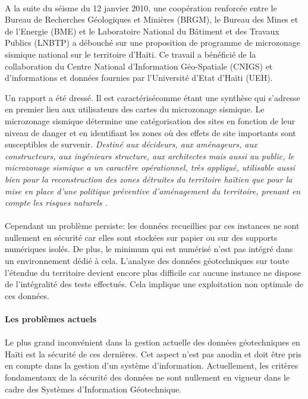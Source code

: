 \paragraph{}
A la suite du séisme du 12 janvier 2010, une coopération renforcée entre le Bureau de
Recherches Géologiques et Minières (BRGM), le Bureau des Mines et de l’Energie (BME) et le
Laboratoire National du Bâtiment et des Travaux Publics (LNBTP) a débouché sur une
proposition de programme de microzonage sismique national sur le territoire d’Haïti.
Ce travail a bénéficié de la collaboration du
Centre National d’Information Géo-Spatiale (CNIGS) et d’informations et données fournies par
l’Université d’Etat d’Haïti (UEH).
\par 
Un rapport \cite{bertil63100equipe} a été dressé. Il est caractérisécomme étant une synthèse qui s’adresse en premier 
lieu aux utilisateurs des cartes du microzonage sismique.
Le microzonage sismique détermine une catégorisation des sites
en fonction de leur niveau de danger et en identifiant les zones où des effets de site
importants sont susceptibles de survenir.
\textit{
         Destiné aux décideurs, aux aménageurs, aux
constructeurs, aux ingénieurs structure, aux architectes mais aussi au public, le microzonage
sismique a un caractère opérationnel, très appliqué, utilisable aussi bien pour la
reconstruction des zones détruites du territoire haïtien que pour la mise en place d’une
politique préventive d’aménagement du territoire, prenant en compte les risques naturels
\cite{bertil63100equipe}.
}

\paragraph{}
Cependant un problème persiste: les données recueillies par ces instances
ne sont nullement en sécurité car elles sont stockées sur papier ou sur des supports numériques isolés.
De plus, le minimum qui est numérisé n'est pas intégré dans un environnement 
dédié à cela.
L'analyse des données géotechniques sur toute l'étendue du territoire devient
encore plus difficile car aucune instance ne dispose de l'intégralité des tests effectués.
Cela implique une exploitation non optimale de ces données.
\paragraph{Les problèmes actuels}
\paragraph{}
Le plus grand inconvénient dans la gestion actuelle des données géotechniques
en Haïti est la sécurité de ces dernières. 
Cet aspect n'est pas anodin et doit être pris en compte dans la gestion d'un système
d'information.
Actuellement, les critères fondamentaux de la sécurité des données ne sont nullement en 
vigueur dans le cadre des Systèmes d'Information Géotechnique.
